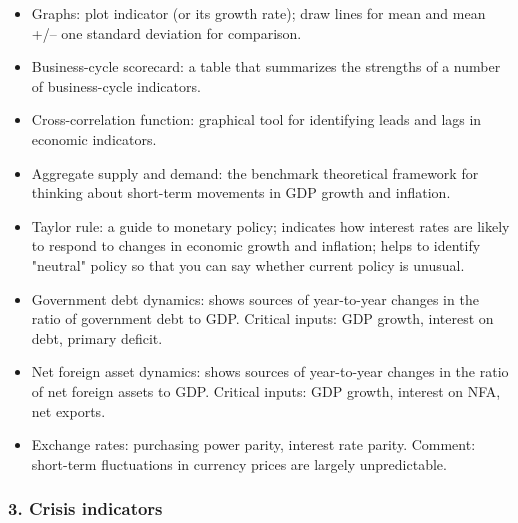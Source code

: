 \documentclass[letterpaper,12pt]{article}
\begin{document}
\begin{itemize}
\item Graphs:  plot indicator (or its growth rate);
    draw lines for mean and mean +/-- one standard deviation 
    for comparison.  
    
\item Business-cycle scorecard:  a table that summarizes 
the strengths of a number of business-cycle indicators. 

\item Cross-correlation function:  graphical tool for identifying leads and lags in economic indicators.  
\item Aggregate supply and demand:  the benchmark theoretical framework for thinking about short-term movements in GDP growth and inflation.  
\item Taylor rule:  a guide to monetary policy; indicates how interest rates are likely to respond to changes in economic growth and inflation; helps to identify "neutral" policy so that you can say whether current policy is unusual.  
\item Government debt dynamics:  shows sources of year-to-year changes in the ratio of government debt to GDP.  Critical inputs:  GDP growth, interest on debt, primary deficit.  
\item Net foreign asset dynamics:  shows sources of year-to-year changes in the ratio of net foreign assets to GDP.  Critical inputs:  GDP growth, interest on NFA, net exports. 
\item Exchange rates:  purchasing power parity, interest rate parity.  
    Comment:  short-term fluctuations in currency prices are 
    largely unpredictable.  
\end{itemize} 


\subsubsection*{3. Crisis indicators} 
\end{document}
